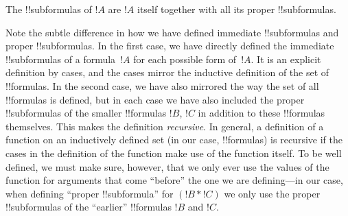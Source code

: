 \documentclass[../../../include/open-logic-section]{subfiles}
\begin{document}
\begin{defn}[!!^{subformula}]
The !!{subformula}s of $!A$ are $!A$ itself together with all its
proper !!{subformula}s.
\end{defn}

\begin{explain}
Note the subtle difference in how we have defined immediate
!!{subformula}s and proper !!{subformula}s.  In the first case, we
have directly defined the immediate !!{subformula}s of a formula~$!A$
for each possible form of~$!A$.  It is an explicit definition by
cases, and the cases mirror the inductive definition of the set of
!!{formula}s.  In the second case, we have also mirrored the way the
set of all !!{formula}s is defined, but in each case we have also
included the proper !!{subformula}s of the smaller !!{formula}s $!B$,
$!C$ in addition to these !!{formula}s themselves.  This makes the
definition \emph{recursive}.  In general, a definition of a function
on an inductively defined set (in our case, !!{formula}s) is recursive
if the cases in the definition of the function make use of
the function itself. To be well defined, we must make sure, however,
that we only ever use the values of the function for arguments that
come ``before'' the one we are defining---in our case, when defining
``proper !!{subformula}'' for $(!B \ast !C)$ we only use the proper
!!{subformula}s of the ``earlier'' !!{formula}s $!B$ and $!C$.
\end{explain}
\end{document}
